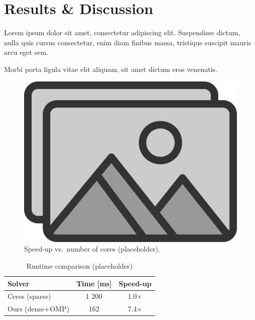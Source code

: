 \section{Results \& Discussion}
Lorem ipsum dolor sit amet, consectetur adipiscing elit. Suspendisse dictum,
nulla quis cursus consectetur, enim diam finibus massa, tristique suscipit
mauris arcu eget sem.

Morbi porta ligula vitae elit aliquam, sit amet dictum eros venenatis.

\begin{figure}[t]
  \centering
  \includegraphics[width=\linewidth]{figs/placeholder}
  \caption{Speed-up vs.\ number of cores (placeholder).}
  \label{fig:results_speedup}
\end{figure}

\begin{table}[b]
  \caption{Runtime comparison (placeholder)}
  \label{tab:results_runtime}
  \centering
  \begin{tabular}{@{}lcc@{}}
    \toprule
    Solver & Time [ms] & Speed-up \\ \midrule
    Ceres (sparse) & 1 200 & 1.0× \\
    Ours (dense+OMP) & 162 & 7.4× \\ \bottomrule
  \end{tabular}
\end{table}
